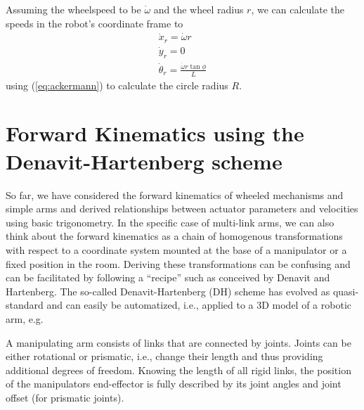 Assuming the wheelspeed to be $\dot{\omega}$ and the wheel radius $r$, we can calculate the speeds in the robot's coordinate frame to
\begin{eqnarray}
\dot{x}_r=\dot{\omega}r\\
\dot{y}_r=0\\
\dot{\theta}_r=\frac{\dot{\omega}r\tan\phi}{L}
\end{eqnarray}
using (\ref{eq:ackermann}) to calculate the circle radius $R$. 

\section{Forward Kinematics using the Denavit-Hartenberg scheme}
So far, we have considered the forward kinematics of wheeled mechanisms and simple arms and derived relationships between actuator parameters and velocities using basic trigonometry. In the specific case of multi-link arms, we can also think about the forward kinematics as a chain of homogenous transformations with respect to a coordinate system mounted at the base of a manipulator or a fixed position in the room. Deriving these transformations can be confusing and can be facilitated by following a ``recipe'' such as conceived by Denavit and Hartenberg. The so-called Denavit-Hartenberg (DH) scheme has evolved as quasi-standard and can easily be automatized, i.e., applied to a 3D model of a robotic arm, e.g. 

A manipulating arm consists of links that are connected by joints. Joints can be either rotational or prismatic, i.e., change their length and thus providing additional degrees of freedom. Knowing the length of all rigid links, the position of the manipulators end-effector is fully described by its joint angles and joint offset (for prismatic joints).



